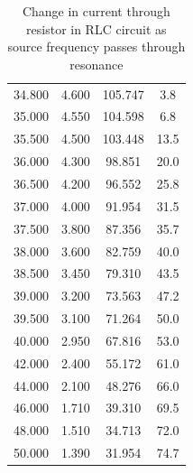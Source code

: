 \documentclass[12pt]{article}
\begin{document}
\begin{table}[h]
\begin{tabular}{@{}SSSS@{}}
34.800 & 4.600 & 105.747 & 3.8   \\
35.000 & 4.550 & 104.598 & 6.8   \\
35.500 & 4.500 & 103.448 & 13.5  \\
36.000 & 4.300 & 98.851  & 20.0  \\
36.500 & 4.200 & 96.552  & 25.8  \\
37.000 & 4.000 & 91.954  & 31.5  \\
37.500 & 3.800 & 87.356  & 35.7  \\
38.000 & 3.600 & 82.759  & 40.0  \\
38.500 & 3.450 & 79.310  & 43.5  \\
39.000 & 3.200 & 73.563  & 47.2  \\
39.500 & 3.100 & 71.264  & 50.0  \\
40.000 & 2.950 & 67.816  & 53.0  \\
42.000 & 2.400 & 55.172  & 61.0  \\
44.000 & 2.100 & 48.276  & 66.0  \\
46.000 & 1.710 & 39.310  & 69.5  \\
48.000 & 1.510 & 34.713  & 72.0  \\
50.000 & 1.390 & 31.954  & 74.7  \\ 
\bottomrule
\end{tabular}
\caption{Change in current through resistor in RLC circuit as source frequency passes through resonance}
\label{table:resonance}
\end{table}
\end{document}
